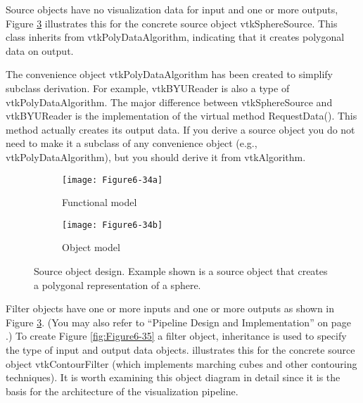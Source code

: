 \begin{description}[leftmargin=0cm,labelindent=0cm]

\item[Source Design.\index{source object!implementation|(}]
Source objects have no visualization data for input and one or more outputs, Figure \ref{fig:Figure6-34} illustrates this for the concrete source object vtkSphereSource. This class inherits from vtkPolyDataAlgorithm, indicating that it creates polygonal data on output.

The convenience object vtkPolyDataAlgorithm has been created to simplify subclass derivation. For example, vtkBYUReader is also a type of vtkPolyDataAlgorithm. The major difference between vtkSphereSource and vtkBYUReader is the implementation of the virtual method RequestData(). This method actually creates its output data. If you derive a source object you do not need to make it a subclass of any convenience object (e.g., vtkPolyDataAlgorithm), but you should derive it from vtkAlgorithm.

\begin{figure}[htb]
	\begin{subfigure}[h]{0.48\linewidth}
		\texttt{[image: Figure6-34a]}
		\caption{Functional model}
		\label{fig:Figure6-34a}
	\end{subfigure}
	\hfill
	\begin{subfigure}[h]{0.48\linewidth}
		\texttt{[image: Figure6-34b]}
		\caption{Object model}
		\label{fig:Figure6-34b}
	\end{subfigure}
	\caption{Source object design. Example shown is a source object that creates a polygonal representation of a sphere.}\label{fig:Figure6-34}
\end{figure}

\item[Filter Design.]

Filter objects have one or more inputs and one or more outputs as shown in Figure \ref{fig:Figure6-34}. (You may also refer to ``Pipeline Design and Implementation'' on page \pageref{subsec:pipeline_design_implementation}.) To create Figure \ref{fig:Figure6-35} a filter object, inheritance is used to specify the type of input and output data objects. illustrates this for the concrete source object vtkContourFilter (which implements marching cubes and other contouring techniques). It is worth examining this object diagram in detail since it is the basis for the architecture of the visualization pipeline.


\end{description}
